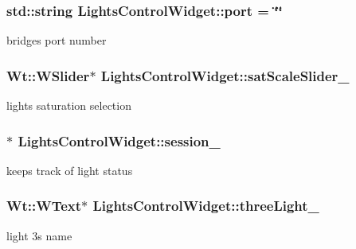 \subsubsection[{\texorpdfstring{port}{port}}]{\setlength{\rightskip}{0pt plus 5cm}std\+::string Lights\+Control\+Widget\+::port = \char`\"{}\char`\"{}\hspace{0.3cm}{\ttfamily [private]}}\hypertarget{classLightsControlWidget_a5760f7ec7c3c36e8faf00ae6b2633ab5}{}\label{classLightsControlWidget_a5760f7ec7c3c36e8faf00ae6b2633ab5}
bridge\textquotesingle{}s port number 
\subsubsection[{\texorpdfstring{sat\+Scale\+Slider\+\_\+}{satScaleSlider_}}]{\setlength{\rightskip}{0pt plus 5cm}Wt\+::\+W\+Slider$\ast$ Lights\+Control\+Widget\+::sat\+Scale\+Slider\+\_\+\hspace{0.3cm}{\ttfamily [private]}}\hypertarget{classLightsControlWidget_af957447fbfc39f4f0c87081be5cf2bf5}{}\label{classLightsControlWidget_af957447fbfc39f4f0c87081be5cf2bf5}
light\textquotesingle{}s saturation selection 
\subsubsection[{\texorpdfstring{session\+\_\+}{session_}}]{$\ast$ Lights\+Control\+Widget\+::session\+\_\+\hspace{0.3cm}{\ttfamily [private]}}\hypertarget{classLightsControlWidget_ad27e600149ef3590947a491470dcb4c8}{}\label{classLightsControlWidget_ad27e600149ef3590947a491470dcb4c8}
keeps track of light status 
\subsubsection[{\texorpdfstring{three\+Light\+\_\+}{threeLight_}}]{\setlength{\rightskip}{0pt plus 5cm}Wt\+::\+W\+Text$\ast$ Lights\+Control\+Widget\+::three\+Light\+\_\+\hspace{0.3cm}{\ttfamily [private]}}\hypertarget{classLightsControlWidget_a82b1ded41fd126f7f4e041ab5b0b7ccb}{}\label{classLightsControlWidget_a82b1ded41fd126f7f4e041ab5b0b7ccb}
light 3\textquotesingle{}s name 
